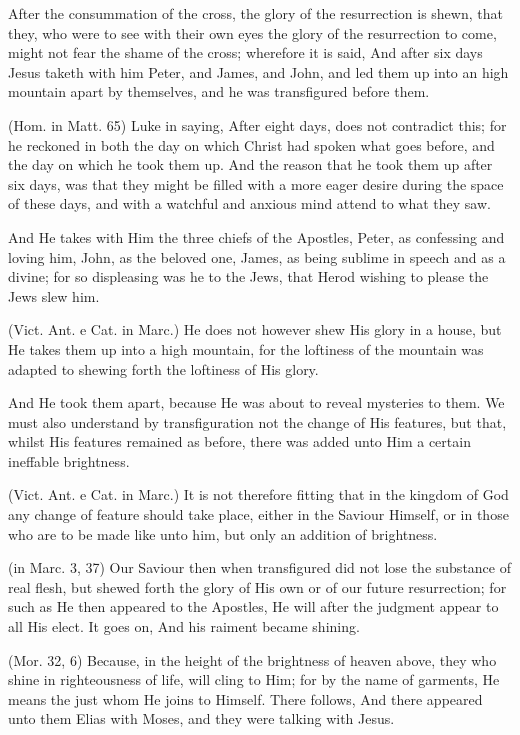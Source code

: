  After the consummation of the cross, the glory of the resurrection is shewn, that they, who were to see with their own eyes the glory of the resurrection to come, might not fear the shame of the cross; wherefore it is said, And after six days Jesus taketh with him Peter, and James, and John, and led them up into an high mountain apart by themselves, and he was transfigured before them.

 (Hom. in Matt. 65) Luke in saying, After eight days, does not contradict this; for he reckoned in both the day on which Christ had spoken what goes before, and the day on which he took them up. And the reason that he took them up after six days, was that they might be filled with a more eager desire during the space of these days, and with a watchful and anxious mind attend to what they saw.

 And He takes with Him the three chiefs of the Apostles, Peter, as confessing and loving him, John, as the beloved one, James, as being sublime in speech and as a divine; for so displeasing was he to the Jews, that Herod wishing to please the Jews slew him.

 (Vict. Ant. e Cat. in Marc.) He does not however shew His glory in a house, but He takes them up into a high mountain, for the loftiness of the mountain was adapted to shewing forth the loftiness of His glory.

 And He took them apart, because He was about to reveal mysteries to them. We must also understand by transfiguration not the change of His features, but that, whilst His features remained as before, there was added unto Him a certain ineffable brightness.

 (Vict. Ant. e Cat. in Marc.) It is not therefore fitting that in the kingdom of God any change of feature should take place, either in the Saviour Himself, or in those who are to be made like unto him, but only an addition of brightness.

 (in Marc. 3, 37) Our Saviour then when transfigured did not lose the substance of real flesh, but shewed forth the glory of His own or of our future resurrection; for such as He then appeared to the Apostles, He will after the judgment appear to all His elect. It goes on, And his raiment became shining.

 (Mor. 32, 6) Because, in the height of the brightness of heaven above, they who shine in righteousness of life, will cling to Him; for by the name of garments, He means the just whom He joins to Himself. There follows, And there appeared unto them Elias with Moses, and they were talking with Jesus.

